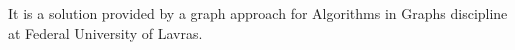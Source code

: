 It is a solution provided by a graph approach for Algorithms in Graphs discipline at Federal University of Lavras. 